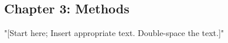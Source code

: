 \newpage
\begin{singlespace}
\section{\protect \centering Chapter 3: Methods}
\end{singlespace}
\doublespacing
\noindent "[Start here; Insert appropriate text. Double-space the text.]"